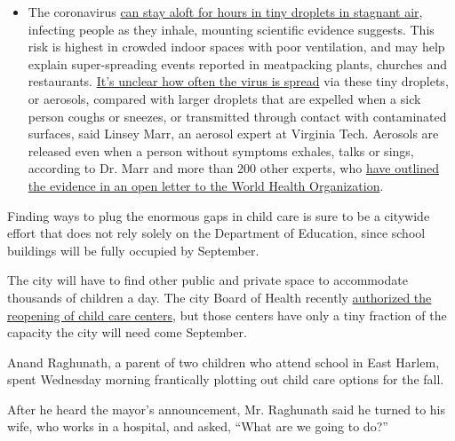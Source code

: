 \begin{itemize}
  \begin{itemize}
  \tightlist
  \item
    The coronavirus
    \href{https://www.nytimes.com/2020/07/04/health/239-experts-with-one-big-claim-the-coronavirus-is-airborne.html?action=click\&pgtype=Article\&state=default\&region=MAIN_CONTENT_3\&context=storylines_faq}{can
    stay aloft for hours in tiny droplets in stagnant air}, infecting
    people as they inhale, mounting scientific evidence suggests. This
    risk is highest in crowded indoor spaces with poor ventilation, and
    may help explain super-spreading events reported in meatpacking
    plants, churches and restaurants.
    \href{https://www.nytimes.com/2020/07/06/health/coronavirus-airborne-aerosols.html?action=click\&pgtype=Article\&state=default\&region=MAIN_CONTENT_3\&context=storylines_faq}{It's
    unclear how often the virus is spread} via these tiny droplets, or
    aerosols, compared with larger droplets that are expelled when a
    sick person coughs or sneezes, or transmitted through contact with
    contaminated surfaces, said Linsey Marr, an aerosol expert at
    Virginia Tech. Aerosols are released even when a person without
    symptoms exhales, talks or sings, according to Dr. Marr and more
    than 200 other experts, who
    \href{https://academic.oup.com/cid/article/doi/10.1093/cid/ciaa939/5867798}{have
    outlined the evidence in an open letter to the World Health
    Organization}.
  \end{itemize}
\end{itemize}

Finding ways to plug the enormous gaps in child care is sure to be a
citywide effort that does not rely solely on the Department of
Education, since school buildings will be fully occupied by September.

The city will have to find other public and private space to accommodate
thousands of children a day. The city Board of Health recently
\href{https://ny.chalkbeat.org/2020/7/7/21316621/nyc-preschools-can-reopen}{authorized
the reopening of child care centers}, but those centers have only a tiny
fraction of the capacity the city will need come September.

Anand Raghunath, a parent of two children who attend school in East
Harlem, spent Wednesday morning frantically plotting out child care
options for the fall.

After he heard the mayor's announcement, Mr. Raghunath said he turned to
his wife, who works in a hospital, and asked, ``What are we going to
do?''

